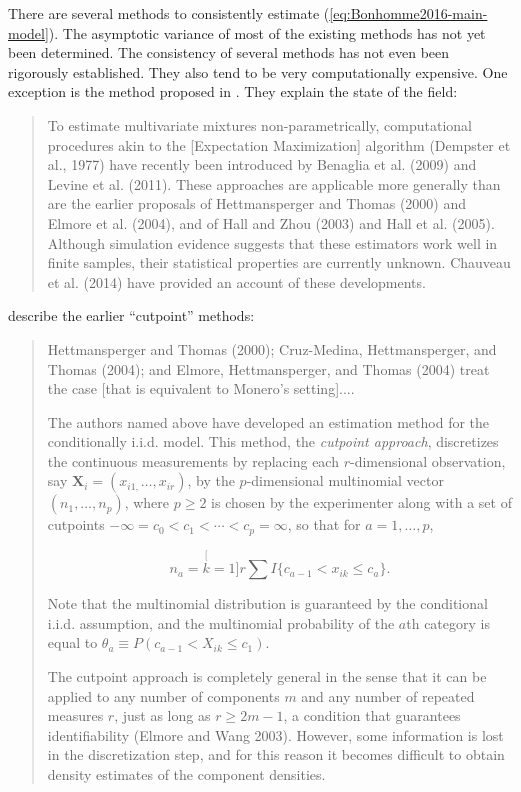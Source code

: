 \documentclass[english]{article}
\begin{document}
There are several methods to consistently estimate (\ref{eq:Bonhomme2016-main-model}).
The asymptotic variance of most of the existing methods has not yet
been determined. The consistency of several methods has not even been
rigorously established. They also tend to be very computationally
expensive. One exception is the method proposed in \cite{Bonhomme2016}.
They explain the state of the field:
\begin{quote}
To estimate multivariate mixtures non-parametrically, computational
procedures akin to the {[}Expectation Maximization{]} algorithm (Dempster
et al., 1977) have recently been introduced by Benaglia et al. (2009)
and Levine et al. (2011). These approaches are applicable more generally
than are the earlier proposals of Hettmansperger and Thomas (2000)
and Elmore et al. (2004), and of Hall and Zhou (2003) and Hall et
al. (2005). Although simulation evidence suggests that these estimators
work well in finite samples, their statistical properties are currently
unknown. Chauveau et al. (2014) have provided an account of these
developments.
\end{quote}
\cite{BenagliaJSS2009} describe the earlier ``cutpoint'' methods:
\begin{quote}
Hettmansperger and Thomas (2000); Cruz-Medina, Hettmansperger, and
Thomas (2004); and Elmore, Hettmansperger, and Thomas (2004) treat
the case {[}that is equivalent to Monero's setting{]}....

The authors named above have developed an estimation method for the
conditionally i.i.d. model. This method, the \textit{cutpoint approach},
discretizes the continuous measurements by replacing each $r$-dimensional
observation, say $\mathbf{X}_{i}=(x_{i1,}\dots,x_{ir})$, by the $p$-dimensional
multinomial vector $(n_{1},\dots,n_{p})$, where $p\geq2$ is chosen
by the experimenter along with a set of cutpoints $-\infty=c_{0}<c_{1}<\cdots<c_{p}=\infty$,
so that for $a=1,\dots,p$,

\[
n_{a}=\stackrel[k=1]{r}{\sum}I\{c_{a-1}<x_{ik}\leq c_{a}\}.
\]

Note that the multinomial distribution is guaranteed by the conditional
i.i.d. assumption, and the multinomial probability of the $a$th category
is equal to $\theta_{a}\equiv P(c_{a-1}<X_{ik}\leq c_{1})$.

The cutpoint approach is completely general in the sense that it can
be applied to any number of components $m$ and any number of repeated
measures $r$, just as long as $r\geq2m-1$, a condition that guarantees
identifiability (Elmore and Wang 2003). However, some information
is lost in the discretization step, and for this reason it becomes
difficult to obtain density estimates of the component densities.
\end{quote}
\end{document}
